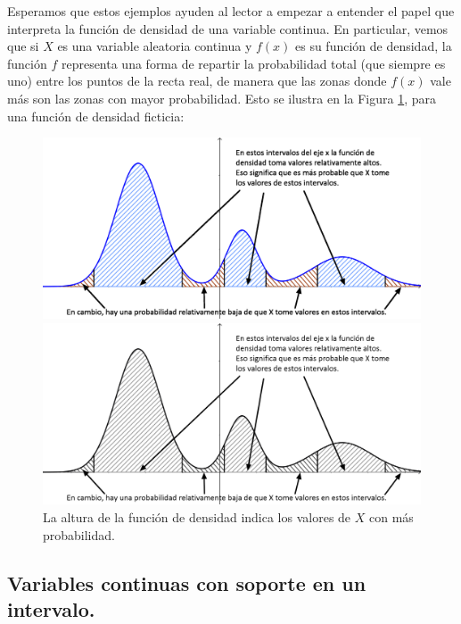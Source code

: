 Esperamos que estos ejemplos ayuden al lector a empezar a entender el papel que interpreta la función de densidad de una variable continua. En particular, vemos que si $X$ es una variable aleatoria continua y  $f(x)$ es su función de densidad, la función $f$ representa una forma de repartir la probabilidad total (que siempre es uno) entre los puntos de la recta real, de manera que las zonas donde $f(x)$ vale más son las zonas con mayor probabilidad. Esto se ilustra en la Figura \ref{cap05:fig:Cap05-InterpretacionFuncionDensidadFicticia-bn.png}, para una función de densidad ficticia:

\begin{figure}[htbp]
\begin{center}
\begin{enColor}
\includegraphics[width=12cm]{../fig/Cap05-InterpretacionFuncionDensidadFicticia.png}
\end{enColor}
\begin{bn}
\includegraphics[width=12cm]{../fig/Cap05-InterpretacionFuncionDensidadFicticia-bn.png}
\end{bn}
\caption{La altura de la función de densidad indica los valores de $X$ con más probabilidad.}
\label{cap05:fig:Cap05-InterpretacionFuncionDensidadFicticia-bn.png}
\end{center}
\end{figure}

\subsection{Variables continuas con soporte en un intervalo.}
\label{cap05:subsec:VariablesContinuasSoporteIntervalo}

